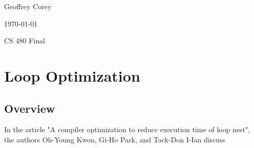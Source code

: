 \documentclass[letterpaper,10pt,titlepage]{article}
\def\name{Geoffrey Corey}
\begin{document}
\hfill \name

\hfill \today

\hfill CS 480 Final

\section*{Loop Optimization}
\subsection*{Overview}
In the article "A compiler optimization to reduce execution time of loop nest", the authors Oh-Young
Kwon, Gi-Ho Park, and Tack-Don I-Ian discuss 



\end{document}
